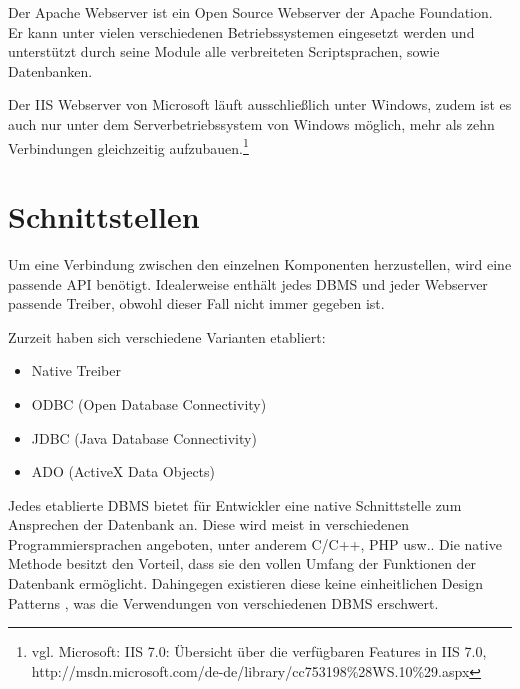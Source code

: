 Der Apache Webserver ist ein Open Source Webserver der Apache Foundation.
Er kann unter vielen verschiedenen Betriebssystemen eingesetzt werden und unterstützt durch seine Module alle verbreiteten Scriptsprachen, sowie Datenbanken.

Der IIS Webserver von Microsoft läuft ausschließlich unter Windows, zudem ist es auch nur unter dem Serverbetriebssystem von Windows möglich, mehr als zehn Verbindungen gleichzeitig aufzubauen.\footnote{vgl. Microsoft: IIS 7.0: Übersicht über die verfügbaren Features in IIS 7.0, http://msdn.microsoft.com/de-de/library/cc753198\%28WS.10\%29.aspx}

\section{Schnittstellen}
\label{sec:schnittstellen}


Um eine Verbindung zwischen den einzelnen Komponenten herzustellen, wird eine passende API benötigt.
Idealerweise enthält jedes DBMS und jeder Webserver passende Treiber, obwohl dieser Fall nicht immer gegeben ist.

Zurzeit haben sich verschiedene Varianten etabliert:

\begin{itemize}
\item Native Treiber
\item ODBC (Open Database Connectivity)
\item JDBC (Java Database Connectivity)
\item ADO (ActiveX Data Objects)
\end{itemize}

Jedes etablierte DBMS bietet für Entwickler eine native Schnittstelle zum Ansprechen der Datenbank an.
Diese wird meist in verschiedenen Programmiersprachen angeboten, unter anderem C/C++, PHP usw..
Die native Methode besitzt den Vorteil, dass sie den vollen Umfang der Funktionen der Datenbank ermöglicht. Dahingegen existieren diese keine einheitlichen Design Patterns , was die Verwendungen von verschiedenen DBMS erschwert.


